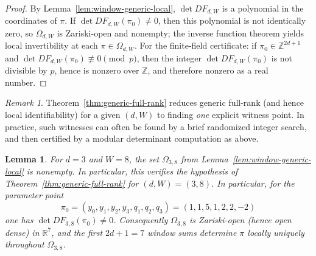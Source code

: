\documentclass[11pt,reqno]{amsart}
\newtheorem{lemma}[theorem]{Lemma}
\theoremstyle{definition}
\theoremstyle{remark}
\newtheorem{remark}[theorem]{Remark} %
\newcommand{\R}{\mathbb{R}}
\newcommand{\1}{\mathbf{1}}
\providecommand{\Z}{\mathbb{Z}}
\begin{document}
\begin{proof}
By Lemma~\ref{lem:window-generic-local}, $\det DF_{d,W}$ is a polynomial in the coordinates of $\pi$. If $\det DF_{d,W}(\pi_0)\neq 0$, then this polynomial is not identically zero, so $\Omega_{d,W}$ is Zariski-open and nonempty; the inverse function theorem yields local invertibility at each $\pi\in\Omega_{d,W}$. For the finite-field certificate: if $\pi_0\in\Z^{2d+1}$ and $\det DF_{d,W}(\pi_0)\not\equiv 0\pmod p$, then the integer $\det DF_{d,W}(\pi_0)$ is not divisible by $p$, hence is nonzero over $\Z$, and therefore nonzero as a real number.
\end{proof}

\begin{remark}
Theorem~\ref{thm:generic-full-rank} reduces generic full-rank (and hence local identifiability) for a given $(d,W)$ to finding \emph{one} explicit witness point. In practice, such witnesses can often be found by a brief randomized integer search, and then certified by a modular determinant computation as above.
\end{remark}

\begin{lemma}\label{lem:witness-38}
For $d=3$ and $W=8$, the set $\Omega_{3,8}$ from Lemma~\ref{lem:window-generic-local} is nonempty. In particular, this verifies the hypothesis of Theorem~\ref{thm:generic-full-rank} for $(d,W)=(3,8)$.
In particular, for the parameter point
\[
\pi_0=(y_0,y_1,y_2,y_3,q_1,q_2,q_3)=(1,1,5,1,2,2,-2)
\]
one has $\det DF_{3,8}(\pi_0)\neq 0$.
Consequently $\Omega_{3,8}$ is Zariski-open (hence open dense) in $\R^{7}$, and the first $2d+1=7$
window sums determine $\pi$ locally uniquely throughout $\Omega_{3,8}$.
\end{lemma}
\end{document}

